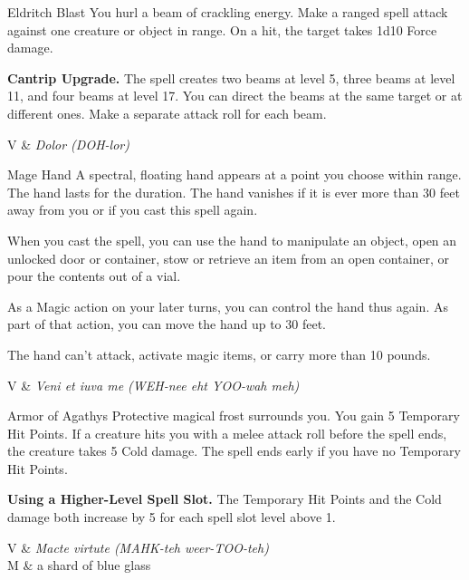 

\pagestyle{empty}

\begin{Spell}[
  level=Cantrip,
  time=1 Action,
  range=120 ft.,
  components={V, S},
  duration=Instantaneous,
  school=Evocation,
  attack=Ranged,
  effect=Force
]{Eldritch Blast}
You hurl a beam of crackling energy. Make a ranged spell attack against one creature or object in range. On a hit, the target takes 1d10 Force damage.

\textbf{Cantrip Upgrade.} The spell creates two beams at level 5, three beams at level 11, and four beams at level 17. You can direct the beams at the same target or at different ones. Make a separate attack roll for each beam.

\begin{components}
V & \textit{Dolor (DOH-lor)}
\end{components}
\end{Spell}


\begin{Spell}[
  level=Cantrip,
  time=1 Action,
  range=30 ft.,
  components={V, S},
  duration=1 Minute,
  school=Conjuration,
  attack=None,
  effect=Utility
]{Mage Hand}
A spectral, floating hand appears at a point you choose within range. The hand lasts for the duration. The hand vanishes if it is ever more than 30 feet away from you or if you cast this spell again.

When you cast the spell, you can use the hand to manipulate an object, open an unlocked door or container, stow or retrieve an item from an open container, or pour the contents out of a vial.

As a Magic action on your later turns, you can control the hand thus again. As part of that action, you can move the hand up to 30 feet.

The hand can't attack, activate magic items, or carry more than 10 pounds.

\begin{components}
V & \textit{Veni et iuva me (WEH-nee eht YOO-wah meh)}
\end{components}
\end{Spell}

\begin{Spell}[
  level=1st,
  time=1 Bonus Action,
  range=Self,
  components={V, S, M},
  duration=1 Hour,
  school=Abjuration,
  attack=None,
  effect=Cold
]{Armor of Agathys}
Protective magical frost surrounds you. You gain 5 Temporary Hit Points. If a creature hits you with a melee attack roll before the spell ends, the creature takes 5 Cold damage. The spell ends early if you have no Temporary Hit Points.

\textbf{Using a Higher-Level Spell Slot.} The Temporary Hit Points and the Cold damage both increase by 5 for each spell slot level above 1.

\begin{components}
V & \textit{Macte virtute (MAHK-teh weer-TOO-teh)}\\
M & a shard of blue glass
\end{components}
\end{Spell}

